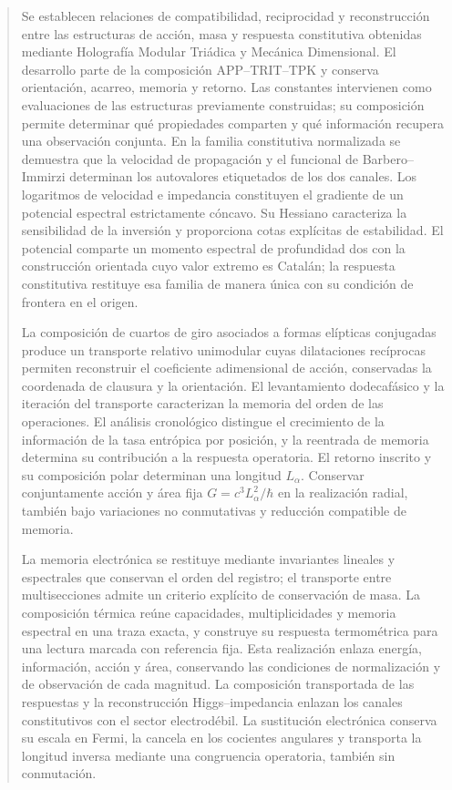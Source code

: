\begin{abstract}
Se establecen relaciones de compatibilidad, reciprocidad y reconstrucción
entre las estructuras de acción, masa y respuesta constitutiva obtenidas
mediante Holografía Modular Triádica y Mecánica Dimensional. El desarrollo
parte de la composición APP--TRIT--TPK y conserva orientación, acarreo,
memoria y retorno. Las constantes intervienen como evaluaciones de las
estructuras previamente construidas; su composición permite determinar qué
propiedades comparten y qué información recupera una observación conjunta.
En la familia constitutiva normalizada se demuestra que la velocidad de
propagación y el funcional de Barbero--Immirzi determinan los autovalores
etiquetados de los dos canales. Los logaritmos de velocidad e impedancia
constituyen el gradiente de un potencial espectral estrictamente cóncavo.
Su Hessiano caracteriza la sensibilidad de la inversión y proporciona cotas
explícitas de estabilidad. El potencial comparte un momento espectral de
profundidad dos con la construcción orientada cuyo valor extremo es Catalán;
la respuesta constitutiva restituye esa familia de manera única con su
condición de frontera en el origen.

La composición de cuartos de giro asociados a formas elípticas conjugadas
produce un transporte relativo unimodular cuyas dilataciones recíprocas
permiten reconstruir el coeficiente adimensional de acción, conservadas la
coordenada de clausura y la orientación. El levantamiento dodecafásico y la
iteración del transporte caracterizan la memoria del orden de las
operaciones. El análisis cronológico distingue el crecimiento de la
información de la tasa entrópica por posición, y la reentrada de memoria
determina su contribución a la respuesta operatoria. El retorno inscrito y
su composición polar determinan una longitud $L_\alpha$. Conservar
conjuntamente acción y área fija $G=c^3L_\alpha^2/\hbar$ en la realización
radial, también bajo variaciones no conmutativas y reducción compatible
de memoria.

La memoria electrónica se restituye mediante invariantes lineales y
espectrales que conservan el orden del registro; el transporte entre
multisecciones admite un criterio explícito de conservación de masa.
La composición térmica reúne capacidades, multiplicidades y memoria
espectral en una traza exacta, y construye su respuesta termométrica
para una lectura marcada con referencia fija. Esta realización enlaza
energía, información, acción y área, conservando las condiciones de
normalización y de observación de cada magnitud.
La composición transportada de las respuestas y la reconstrucción
Higgs--impedancia enlazan los canales constitutivos con el sector
electrodébil. La sustitución electrónica conserva su escala en Fermi,
la cancela en los cocientes angulares y transporta la longitud inversa
mediante una congruencia operatoria, también sin conmutación.


\end{abstract}
